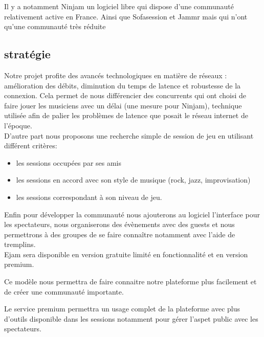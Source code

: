 \documentclass[a4,12pt]{article}
\begin{document}
Il y a notamment Ninjam un logiciel libre qui dispose d'une communauté relativement active en France.
Ainsi que Sofasession et Jammr mais qui n'ont qu'une communauté très réduite

\subsection{stratégie}

Notre projet profite des avancés technologiques en matière de réseaux : amélioration des débits, diminution du temps de latence et robustesse de la connexion. Cela permet de nous différencier des concurrents qui ont choisi de faire jouer les musiciens avec un délai (une mesure pour Ninjam), technique utilisée afin de palier les problèmes de latence que posait le réseau internet de l’époque.
\\

D’autre part nous proposons une recherche simple de session de jeu en utilisant différent critères:
\begin{itemize}
	\item les sessions occupées par ses amis
	\item les sessions en accord avec son style de musique (rock, jazz, improvisation)
	\item les sessions correspondant à son niveau de jeu.
\end{itemize}

Enfin pour développer la communauté nous ajouterons au logiciel
l’interface pour les spectateurs, nous organiserons des évènements avec des
guests et nous permettrons à des groupes de se faire connaître notamment
avec l’aide de tremplins.
\\

Ejam sera disponible en version gratuite limité en fonctionnalité et en version premium.

Ce modèle nous permettra de faire connaitre notre plateforme plus facilement et de créer une communauté importante.

Le service premium permettra un usage complet de la plateforme avec plus d'outils disponible dans les sessions notamment pour gérer l'aspet public avec les spectateurs.
\end{document}
